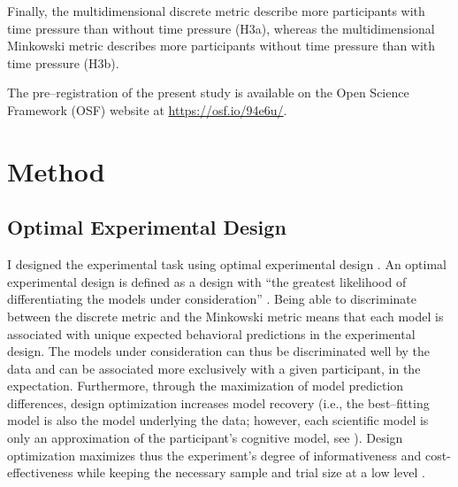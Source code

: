 \documentclass[a4paper,man,natbib]{apa6}
\begin{document}
Finally, the multidimensional discrete metric describe more participants with time pressure than without time pressure (H3a), whereas the multidimensional Minkowski metric describes more participants without time pressure than with time pressure (H3b).

The pre--registration of the present study is available on the Open Science Framework (OSF) website at \href{https://osf.io/94e6u/}{https://osf.io/94e6u/}.

\section{Method}

\subsection{Optimal Experimental Design}
I designed the experimental task using optimal experimental design \citep{myung2009optimal}. An optimal experimental design is defined as a design with ``the greatest likelihood of differentiating the models under consideration'' \cite[][p. 500]{myung2009optimal}. Being able to discriminate between the discrete metric and the Minkowski metric means that each model is associated with unique expected behavioral predictions in the experimental design. The models under consideration can thus be discriminated well by the data and can be associated more exclusively with a given participant, in the expectation. Furthermore, through the maximization of model prediction differences, design optimization increases model recovery (i.e., the best--fitting model is also the model underlying the data; however, each scientific model is only an approximation of the participant's cognitive model, see \citealp{myung2009optimal}). 
Design optimization maximizes thus the experiment's degree of informativeness and cost-effectiveness while keeping the necessary sample and trial size at a low level \citep{cavagnaro2009better, ouyang2016practical, raffert2012optimally, atkinson2007optimum, nelson2005finding}. 
\end{document}
